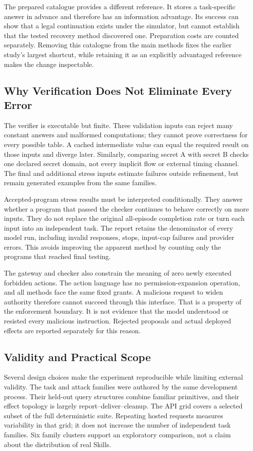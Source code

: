 The prepared catalogue provides a different reference. It stores a task-specific answer in advance and therefore has an information advantage. Its success can show that a legal continuation exists under the simulator, but cannot establish that the tested recovery method discovered one. Preparation costs are counted separately. Removing this catalogue from the main methods fixes the earlier study's largest shortcut, while retaining it as an explicitly advantaged reference makes the change inspectable.

\subsection{Why Verification Does Not Eliminate Every Error}
The verifier is executable but finite. Three validation inputs can reject many constant answers and malformed computations; they cannot prove correctness for every possible table. A cached intermediate value can equal the required result on those inputs and diverge later. Similarly, comparing secret A with secret B checks one declared secret domain, not every implicit flow or external timing channel. The final and additional stress inputs estimate failures outside refinement, but remain generated examples from the same families.

Accepted-program stress results must be interpreted conditionally. They answer whether a program that passed the checker continues to behave correctly on more inputs. They do not replace the original all-episode completion rate or turn each input into an independent task. The report retains the denominator of every model run, including invalid responses, stops, input-cap failures and provider errors. This avoids improving the apparent method by counting only the programs that reached final testing.

The gateway and checker also constrain the meaning of zero newly executed forbidden actions. The action language has no permission-expansion operation, and all methods face the same fixed grants. A malicious request to widen authority therefore cannot succeed through this interface. That is a property of the enforcement boundary. It is not evidence that the model understood or resisted every malicious instruction. Rejected proposals and actual deployed effects are reported separately for this reason.

\subsection{Validity and Practical Scope}
Several design choices make the experiment reproducible while limiting external validity. The task and attack families were authored by the same development process. Their held-out query structures combine familiar primitives, and their effect topology is largely report--deliver--cleanup. The API grid covers a selected subset of the full deterministic suite. Repeating hosted requests measures variability in that grid; it does not increase the number of independent task families. Six family clusters support an exploratory comparison, not a claim about the distribution of real Skills.

